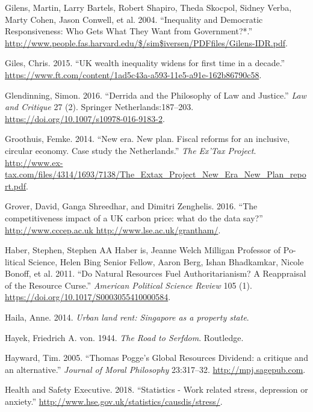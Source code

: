 \documentclass[]{tufte-handout}
\begin{document}
\leavevmode\hypertarget{ref-Gilens2004}{}%
Gilens, Martin, Larry Bartels, Robert Shapiro, Theda Skocpol, Sidney
Verba, Marty Cohen, Jason Conwell, et al. 2004. ``Inequality and
Democratic Responsiveness: Who Gets What They Want from Government?*.''
\url{http://www.people.fas.harvard.edu/$/sim$iversen/PDFfiles/Gilens-IDR.pdf}.

\leavevmode\hypertarget{ref-Giles2015}{}%
Giles, Chris. 2015. ``UK wealth inequality widens for first time in a
decade.''
\url{https://www.ft.com/content/1ad5c43a-a593-11e5-a91e-162b86790c58}.

\leavevmode\hypertarget{ref-Glendinning2016}{}%
Glendinning, Simon. 2016. ``Derrida and the Philosophy of Law and
Justice.'' \emph{Law and Critique} 27 (2). Springer
Netherlands:187--203. \url{https://doi.org/10.1007/s10978-016-9183-2}.

\leavevmode\hypertarget{ref-Groothuis2014}{}%
Groothuis, Femke. 2014. ``New era. New plan. Fiscal reforms for an
inclusive, circular economy. Case study the Netherlands.'' \emph{The
Ex'Tax Project}.
\url{http://www.ex-tax.com/files/4314/1693/7138/The_Extax_Project_New_Era_New_Plan_report.pdf}.

\leavevmode\hypertarget{ref-Grover2016}{}%
Grover, David, Ganga Shreedhar, and Dimitri Zenghelis. 2016. ``The
competitiveness impact of a UK carbon price: what do the data say?''
\href{http://www.cccep.ac.uk\%20http://www.lse.ac.uk/grantham/}{http://www.cccep.ac.uk http://www.lse.ac.uk/grantham/}.

\leavevmode\hypertarget{ref-Haber2011}{}%
Haber, Stephen, Stephen AA Haber is, Jeanne Welch Milligan Professor of
Po-litical Science, Helen Bing Senior Fellow, Aaron Berg, Ishan
Bhadkamkar, Nicole Bonoff, et al. 2011. ``Do Natural Resources Fuel
Authoritarianism? A Reappraisal of the Resource Curse.'' \emph{American
Political Science Review} 105 (1).
\url{https://doi.org/10.1017/S0003055410000584}.

\leavevmode\hypertarget{ref-Haila2015}{}%
Haila, Anne. 2014. \emph{Urban land rent: Singapore as a property
state}.

\leavevmode\hypertarget{ref-Hayek1944}{}%
Hayek, Friedrich A. von. 1944. \emph{The Road to Serfdom}. Routledge.

\leavevmode\hypertarget{ref-Hayward2005}{}%
Hayward, Tim. 2005. ``Thomas Pogge's Global Resources Dividend: a
critique and an alternative.'' \emph{Journal of Moral Philosophy}
23:317--32. \url{http://mpj.sagepub.com}.

\leavevmode\hypertarget{ref-HealthandSafetyExecutive2018}{}%
Health and Safety Executive. 2018. ``Statistics - Work related stress,
depression or anxiety.''
\url{http://www.hse.gov.uk/statistics/causdis/stress/}.
\end{document}

